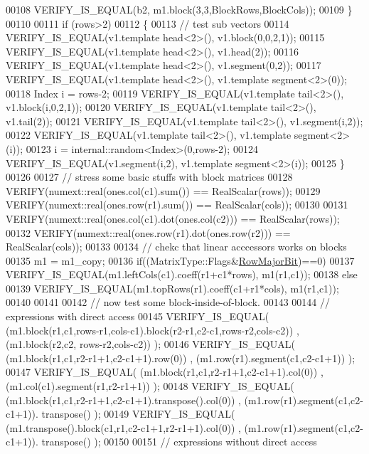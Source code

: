 \begin{DoxyCode}
00108     VERIFY\_IS\_EQUAL(b2, m1.block(3,3,BlockRows,BlockCols));
00109   \}
00110 
00111   \textcolor{keywordflow}{if} (rows>2)
00112   \{
00113     \textcolor{comment}{// test sub vectors}
00114     VERIFY\_IS\_EQUAL(v1.template head<2>(), v1.block(0,0,2,1));
00115     VERIFY\_IS\_EQUAL(v1.template head<2>(), v1.head(2));
00116     VERIFY\_IS\_EQUAL(v1.template head<2>(), v1.segment(0,2));
00117     VERIFY\_IS\_EQUAL(v1.template head<2>(), v1.template segment<2>(0));
00118     Index i = rows-2;
00119     VERIFY\_IS\_EQUAL(v1.template tail<2>(), v1.block(i,0,2,1));
00120     VERIFY\_IS\_EQUAL(v1.template tail<2>(), v1.tail(2));
00121     VERIFY\_IS\_EQUAL(v1.template tail<2>(), v1.segment(i,2));
00122     VERIFY\_IS\_EQUAL(v1.template tail<2>(), v1.template segment<2>(i));
00123     i = internal::random<Index>(0,rows-2);
00124     VERIFY\_IS\_EQUAL(v1.segment(i,2), v1.template segment<2>(i));
00125   \}
00126 
00127   \textcolor{comment}{// stress some basic stuffs with block matrices}
00128   VERIFY(numext::real(ones.col(c1).sum()) == RealScalar(rows));
00129   VERIFY(numext::real(ones.row(r1).sum()) == RealScalar(cols));
00130 
00131   VERIFY(numext::real(ones.col(c1).dot(ones.col(c2))) == RealScalar(rows));
00132   VERIFY(numext::real(ones.row(r1).dot(ones.row(r2))) == RealScalar(cols));
00133   
00134   \textcolor{comment}{// chekc that linear acccessors works on blocks}
00135   m1 = m1\_copy;
00136   \textcolor{keywordflow}{if}((MatrixType::Flags&\hyperlink{group__flags_gae4f56c2a60bbe4bd2e44c5b19cbe8762}{RowMajorBit})==0)
00137     VERIFY\_IS\_EQUAL(m1.leftCols(c1).coeff(r1+c1*rows), m1(r1,c1));
00138   \textcolor{keywordflow}{else}
00139     VERIFY\_IS\_EQUAL(m1.topRows(r1).coeff(c1+r1*cols), m1(r1,c1));
00140   
00141 
00142   \textcolor{comment}{// now test some block-inside-of-block.}
00143   
00144   \textcolor{comment}{// expressions with direct access}
00145   VERIFY\_IS\_EQUAL( (m1.block(r1,c1,rows-r1,cols-c1).block(r2-r1,c2-c1,rows-r2,cols-c2)) , (m1.block(r2,c2,
      rows-r2,cols-c2)) );
00146   VERIFY\_IS\_EQUAL( (m1.block(r1,c1,r2-r1+1,c2-c1+1).row(0)) , (m1.row(r1).segment(c1,c2-c1+1)) );
00147   VERIFY\_IS\_EQUAL( (m1.block(r1,c1,r2-r1+1,c2-c1+1).col(0)) , (m1.col(c1).segment(r1,r2-r1+1)) );
00148   VERIFY\_IS\_EQUAL( (m1.block(r1,c1,r2-r1+1,c2-c1+1).transpose().col(0)) , (m1.row(r1).segment(c1,c2-c1+1)).
      transpose() );
00149   VERIFY\_IS\_EQUAL( (m1.transpose().block(c1,r1,c2-c1+1,r2-r1+1).col(0)) , (m1.row(r1).segment(c1,c2-c1+1)).
      transpose() );
00150 
00151   \textcolor{comment}{// expressions without direct access}

\end{DoxyCode}
